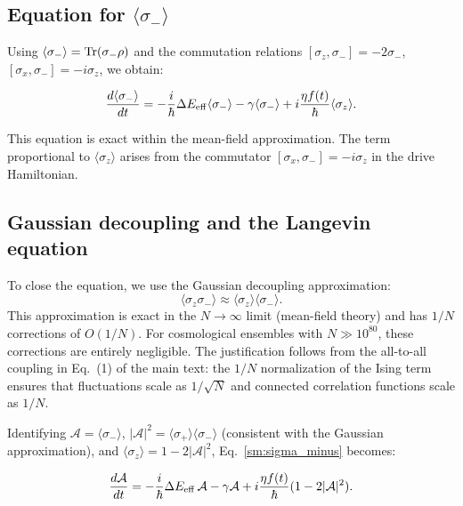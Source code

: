 \documentclass[aps,prd,onecolumn]{revtex4-2}
\begin{document}
\subsection{Equation for $\langle\sigma_-\rangle$}

Using $\langle\sigma_-\rangle = {\rm Tr}(\sigma_-\rho)$ and the commutation relations $[\sigma_z, \sigma_-] = -2\sigma_-$, $[\sigma_x, \sigma_-] = -i\sigma_z$, we obtain:

\begin{equation}
\frac{d\langle\sigma_-\rangle}{dt} = -\frac{i}{\hbar}\Delta E_{\rm eff}\langle\sigma_-\rangle - \gamma\langle\sigma_-\rangle + i\frac{\eta f(t)}{\hbar}\langle\sigma_z\rangle.
\label{sm:sigma_minus}
\end{equation}

This equation is exact within the mean-field approximation. The term proportional to $\langle\sigma_z\rangle$ arises from the commutator $[\sigma_x, \sigma_-] = -i\sigma_z$ in the drive Hamiltonian.

\subsection{Gaussian decoupling and the Langevin equation}

To close the equation, we use the Gaussian decoupling approximation:
\begin{equation}
\langle\sigma_z\sigma_-\rangle \approx \langle\sigma_z\rangle\langle\sigma_-\rangle.
\label{sm:gaussian}
\end{equation}
This approximation is exact in the $N \to \infty$ limit (mean-field theory) and has $1/N$ corrections of $O(1/N)$. For cosmological ensembles with $N \gg 10^{80}$, these corrections are entirely negligible. The justification follows from the all-to-all coupling in Eq.~(1) of the main text: the $1/N$ normalization of the Ising term ensures that fluctuations scale as $1/\sqrt{N}$ and connected correlation functions scale as $1/N$.

Identifying $\mathcal{A} = \langle\sigma_-\rangle$, $|\mathcal{A}|^2 = \langle\sigma_+\rangle\langle\sigma_-\rangle$ (consistent with the Gaussian approximation), and $\langle\sigma_z\rangle = 1 - 2|\mathcal{A}|^2$, Eq.~\eqref{sm:sigma_minus} becomes:

\begin{equation}
\frac{d\mathcal{A}}{dt} = -\frac{i}{\hbar}\Delta E_{\rm eff}\,\mathcal{A} - \gamma\mathcal{A} + i\frac{\eta f(t)}{\hbar}(1-2|\mathcal{A}|^2).
\label{sm:pre_langevin}
\end{equation}
\end{document}
